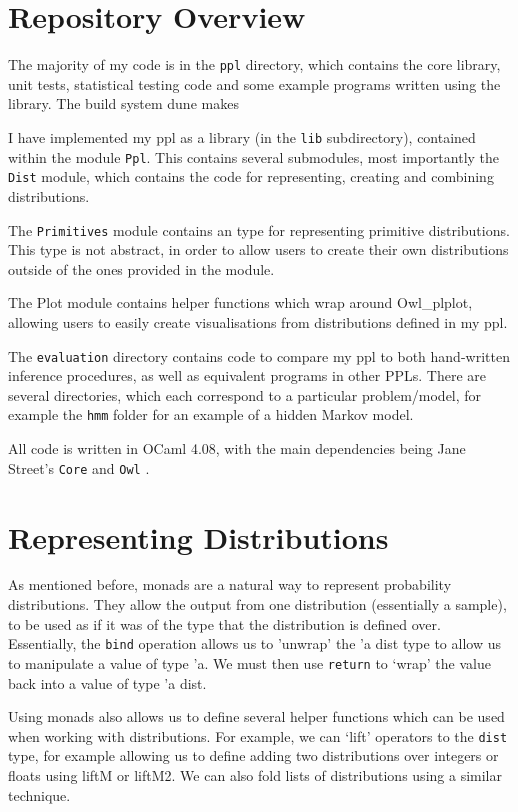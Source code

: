 \section{Repository Overview}

The majority of my code is in the \texttt{ppl} directory, which contains the core library, unit tests, statistical testing code and some example programs written using the library. The build system dune makes 


I have implemented my ppl as a library (in the \texttt{lib} subdirectory), contained within the module \texttt{Ppl}. This contains several submodules, most importantly the \texttt{Dist} module, which contains the code for representing, creating and combining distributions. 

The \texttt{Primitives} module contains an type for representing primitive distributions. This type is not abstract, in order to allow users to create their own distributions outside of the ones provided in the module.

The Plot module contains helper functions which wrap around Owl\_plplot, allowing users to easily create visualisations from distributions defined in my ppl.

The \texttt{evaluation} directory contains code to compare my ppl to both hand-written inference procedures, as well as equivalent programs in other PPLs. There are several directories, which each correspond to a particular problem/model, for example the \texttt{hmm} folder for an example of a hidden Markov model.

All code is written in OCaml 4.08, with the main dependencies being Jane Street's \texttt{Core} and \texttt{Owl} \cite{owl}.

\section{Representing Distributions}

As mentioned before, monads are a natural way to represent probability distributions. They allow the output from one distribution (essentially a sample), to be used as if it was of the type that the distribution is defined over. Essentially, the \texttt{bind} operation allows us to 'unwrap' the 'a dist type to allow us to manipulate a value of type 'a. We must then use \texttt{return} to `wrap' the value back into a value of type 'a dist.

Using monads also allows us to define several helper functions which can be used when working with distributions. For example, we can `lift' operators to the \texttt{dist} type, for example allowing us to define adding two distributions over integers or floats using liftM or liftM2. We can also fold lists of distributions using a similar technique.

